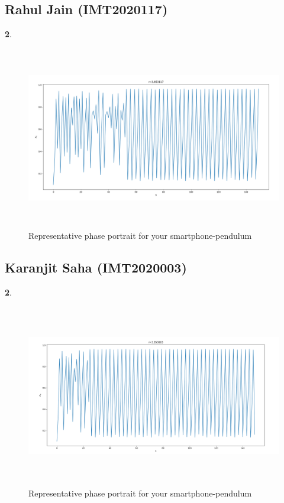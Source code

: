 \documentclass[11pt]{scrartcl} %
\begin{document}
\subsection{Rahul Jain (IMT2020117)}
\textbf{2}.
\begin{figure}[h] %
	\centering
	\includegraphics[width=12cm, height=8cm]{Rahul_singer.png} %
	\caption {Representative phase portrait for your smartphone-pendulum}
\end{figure}
\subsection{Karanjit Saha (IMT2020003)}
\textbf{2}.
\begin{figure}[h] %
	\centering
	\includegraphics[width=12cm, height=8cm]{Karanjit.png} %
	\caption {Representative phase portrait for your smartphone-pendulum}
\end{figure}
\end{document}
